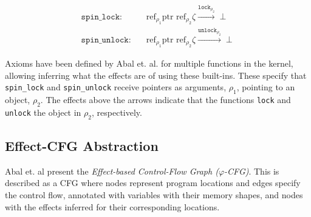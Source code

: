 \begin{equation*}
\begin{aligned}
        \texttt{spin\_lock}: \quad & \text{ref}_{\rho_1} \text{ptr } \text{ref}_{\rho_2} \zeta \xrightarrow{{\texttt{lock}}_{\rho_2}}\perp \\
        \texttt{spin\_unlock}: \quad & \text{ref}_{\rho_1} \text{ptr } \text{ref}_{\rho_2} \zeta \xrightarrow{{\texttt{unlock}}_{\rho_2}}\perp
\end{aligned}
\end{equation*}

\newpar Axioms have been defined by Abal et. al. for multiple functions in the kernel, allowing inferring what the effects are of using these built-ins. These specify that \texttt{spin\_lock} and \texttt{spin\_unlock} receive pointers as arguments, $\rho_1$, pointing to an object, $\rho_2$. The effects above the arrows indicate that the functions \texttt{lock} and \texttt{unlock} the object in $\rho_2$, respectively.

\subsection{Effect-CFG Abstraction}
Abal et. al present the \textit{Effect-based Control-Flow Graph ($\varphi$-CFG)}. This is described as a CFG where nodes represent program locations and edges specify the control flow, annotated with variables with their memory shapes, and nodes with the effects inferred for their corresponding locations. 
